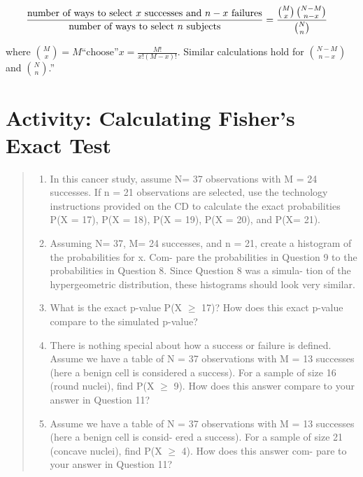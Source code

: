 \documentclass[
]{report}
\providecommand{\tightlist}{%
  \setlength{\itemsep}{0pt}\setlength{\parskip}{0pt}}
\begin{document}
\begin{align}
\frac{\text{number of ways to select $x$ successes and $n - x$ failures}}{\text{number of ways to select $n$ subjects}}
 &= \frac{\binom{M}{x}\,\binom{N - M}{n - x}}{\binom{N}{n}} \notag
\end{align}

where \(\binom{M}{x} = M \text{“choose”} x = \frac{M!}{x!(M - x)!}\). Similar calculations hold for \(\binom{N - M}{n - x}\) and \(\binom{N}{n}\).''

\section*{Activity: Calculating Fisher's Exact Test}\label{activity-calculating-fishers-exact-test}

\begin{quote}
\begin{enumerate}
\def\labelenumi{\arabic{enumi}.}
\setcounter{enumi}{8}
\tightlist
\item
  In this cancer study, assume N= 37 observations with M = 24 successes. If n = 21 observations
  are selected, use the technology instructions provided on the CD to calculate the exact probabilities
  P(X = 17), P(X = 18), P(X = 19), P(X = 20), and P(X= 21).
\item
  Assuming N= 37, M= 24 successes, and n = 21, create a histogram of the probabilities for x. Com-
  pare the probabilities in Question 9 to the probabilities in Question 8. Since Question 8 was a simula-
  tion of the hypergeometric distribution, these histograms should look very similar.
\item
  What is the exact p-value P(X \(\geq\) 17)? How does this exact p-value compare to the simulated
  p-value?
\item
  There is nothing special about how a success or failure is defined. Assume we have a table of
  N = 37 observations with M = 13 successes (here a benign cell is considered a success). For a
  sample of size 16 (round nuclei), find P(X \(\geq\) 9). How does this answer compare to your answer in
  Question 11?
\item
  Assume we have a table of N = 37 observations with M = 13 successes (here a benign cell is consid-
  ered a success). For a sample of size 21 (concave nuclei), find P(X \(\geq\) 4). How does this answer com-
  pare to your answer in Question 11?
\end{enumerate}
\end{quote}
\end{document}
